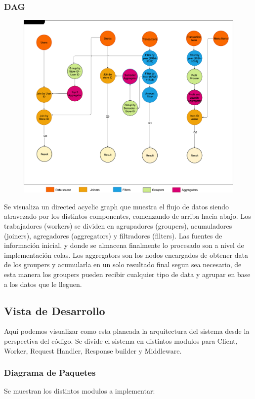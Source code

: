\documentclass[titlepage,a4paper]{article}
\begin{document}
\subsubsection{DAG}
\begin{figure}[H]
\centering
    \includegraphics[width=1\linewidth]{DAG.png}
\end{figure}
Se visualiza un directed acyclic graph que muestra el flujo de datos siendo atravezado por los distintos componentes, comenzando de arriba hacia abajo. Los trabajadores (workers) se dividen en agrupadores (groupers), acumuladores (joiners), agregadores (aggregators) y filtradores (filters). Las fuentes de información inicial, y donde se almacena finalmente lo procesado son a nivel de implementación colas.
Los aggregators son los nodos encargados de obtener data de los groupers y acumularla en un solo resultado final segun sea necesario, de esta manera los groupers pueden recibir cualquier tipo de data y agrupar en ba\textbf{}se a los datos que le lleguen.


\subsection{Vista de Desarrollo}
Aquí podemos visualizar como esta planeada la arquitectura del sistema desde la perspectiva del código. Se divide el sistema en distintos modulos para Client, Worker, Request Handler, Response builder y Middleware.

\subsubsection{Diagrama de Paquetes}
Se muestran los distintos modulos a implementar:\newline
\end{document}
